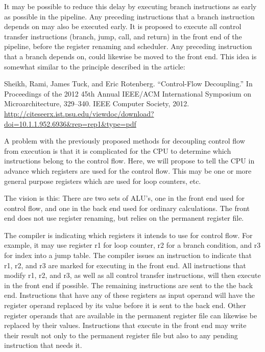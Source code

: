 \documentclass[forwardcom.tex]{subfiles}
\begin{document}
It may be possible to reduce this delay by executing branch instructions as early as possible in the pipeline. Any preceding instructions that a branch instruction depends on may also be executed early. It is proposed to execute all control transfer instructions (branch, jump, call, and return) in the front end of the pipeline, before the register renaming and scheduler. Any preceding instruction that a branch depends on, could likewise be moved to the front end. This idea is somewhat similar to the principle described in the article:

Sheikh, Rami, James Tuck, and Eric Rotenberg. “Control-Flow Decoupling.” In Proceedings of the 2012 45th Annual IEEE/ACM International Symposium on Microarchitecture, 329–340. IEEE Computer Society, 2012.
\url{http://citeseerx.ist.psu.edu/viewdoc/download?doi=10.1.1.952.6936&rep=rep1&type=pdf}
\vspace{2mm}

A problem with the previously proposed methods for decoupling control flow from execution is that it is complicated for the CPU to determine which instructions belong to the control flow. Here, we will propose to tell the CPU in advance which registers are used for the control flow. This may be one or more general purpose registers which are used for loop counters, etc.
\vspace{2mm}

The vision is this: There are two sets of ALU's, one in the front end used for control flow, and one in the back end used for ordinary calculations. The front end does not use register renaming, but relies on the permanent register file.
\vspace{2mm}

The compiler is indicating which registers it intends to use for control flow. For example, it may use register r1 for loop counter, r2 for a branch condition, and r3 for index into a jump table. The compiler issues an instruction to indicate that r1, r2, and r3 are marked for executing in the front end. 
All instructions that modify r1, r2, and r3, as well as all control transfer instructions, will then execute in the front end if possible. The remaining instructions are sent to the the back end. Instructions that have any of these registers as input operand will have the register operand replaced by its value before it is sent to the back end. Other register operands that are available in the permanent register file can likewise be replaced by their values. Instructions that execute in the front end may write their result not only to the permanent register file but also to any pending instruction that needs it.
\vspace{2mm}
\end{document}
